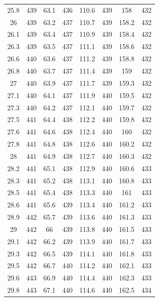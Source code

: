 \documentclass[12pt]{ctexart}
\numberwithin{equation}{section}
\begin{document}
\begin{longtable}{cc|cc|cc|cc}
25.8  &  439  &  63.1  &  436  &  110.6  &  439  &  158  &  432  \\
26  &  439  &  63.2  &  437  &  110.7  &  439  &  158.2  &  432  \\
26.1  &  439  &  63.4  &  437  &  110.9  &  439  &  158.4  &  432  \\
26.3  &  439  &  63.5  &  437  &  111.1  &  439  &  158.6  &  432  \\
26.6  &  440  &  63.6  &  437  &  111.2  &  439  &  158.8  &  432  \\
26.8  &  440  &  63.7  &  437  &  111.4  &  439  &  159  &  432  \\
27  &  440  &  63.9  &  437  &  111.7  &  439  &  159.3  &  432  \\
27.1  &  440  &  64.1  &  437  &  111.9  &  440  &  159.5  &  432  \\
27.3  &  440  &  64.2  &  437  &  112.1  &  440  &  159.7  &  432  \\
27.5  &  441  &  64.4  &  438  &  112.2  &  440  &  159.8  &  432  \\
27.6  &  441  &  64.6  &  438  &  112.4  &  440  &  160  &  432  \\
27.8  &  441  &  64.8  &  438  &  112.6  &  440  &  160.2  &  432  \\
28  &  441  &  64.9  &  438  &  112.7  &  440  &  160.3  &  432  \\
28.2  &  441  &  65.1  &  438  &  112.9  &  440  &  160.6  &  433  \\
28.3  &  441  &  65.2  &  438  &  113.1  &  440  &  160.8  &  433  \\
28.5  &  441  &  65.4  &  438  &  113.3  &  440  &  161  &  433  \\
28.6  &  441  &  65.6  &  439  &  113.4  &  440  &  161.2  &  433  \\
28.9  &  442  &  65.7  &  439  &  113.6  &  440  &  161.3  &  433  \\
29  &  442  &  66  &  439  &  113.8  &  440  &  161.5  &  433  \\
29.1  &  442  &  66.2  &  439  &  113.9  &  440  &  161.7  &  433  \\
29.3  &  442  &  66.5  &  439  &  114.1  &  440  &  161.8  &  433  \\
29.5  &  442  &  66.7  &  440  &  114.2  &  440  &  162.1  &  433  \\
29.6  &  443  &  66.9  &  440  &  114.4  &  440  &  162.3  &  433  \\
29.8  &  443  &  67.1  &  440  &  114.6  &  440  &  162.5  &  434  \\

\end{longtable}
\end{document}
